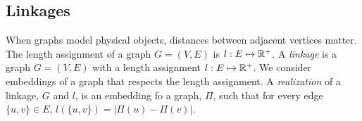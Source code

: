 \subsection{Linkages}
When graphs model physical objects, distances between adjacent vertices matter. The length 
assignment of a graph $G=(V,E)$ is $l:E \mapsto {\mathbb{R}}^+$. A \textit{linkage} is a graph $G = 
(V,E)$ with a length assignment $l:E \mapsto {\mathbb{R}}^+$.  We consider embeddings of a graph that 
respects the length assignment.  A \textit{realization} of a linkage, $G$ and $l$, is an embedding 
fo a graph, $\Pi$, such that for every edge $\{u,v\} \in E$, $l\left( \{u,v\} \right) 
= \left\vert \Pi(u) - \Pi(v) \right\vert$.




